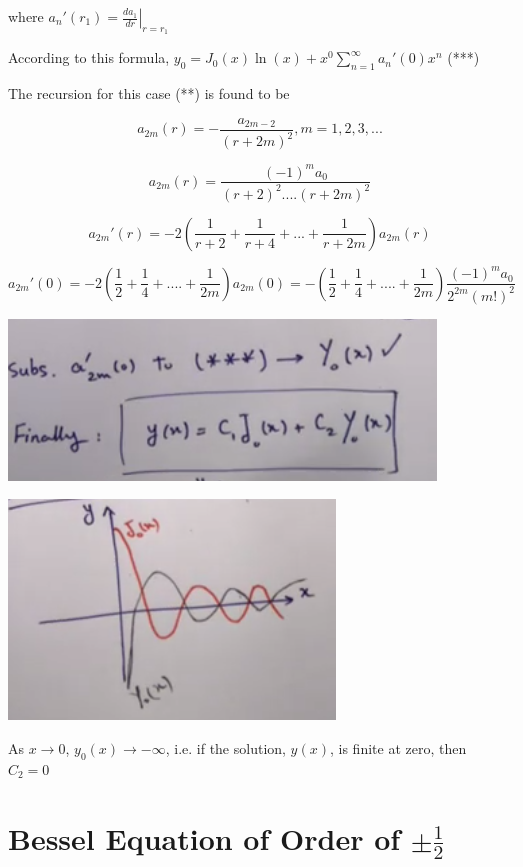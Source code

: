 \documentclass{article}
\begin{document}
where $a_n ' (r_1) = \left. \frac{d a_1}{dr} \right|_{r = r_1}$

According to this formula, $y_0 = J_0 (x) \ln(x) + x^{0} \sum_{n = 1}^\infty a_n' (0) x^n$ (***)

The recursion for this case (**) is found to be 

$$a_{2m} (r) = - \frac{a_{2m-2}}{(r + 2m)^2}, m = 1,2,3,...$$

$$a_{2m}(r) = \frac{(-1)^m a_0}{(r+2)^2 .... (r + 2m)^2}$$

$$a_{2m}' (r) = -2 \left( \frac{1}{r+2} + \frac{1}{r+4} + ... + \frac{1}{r + 2m} \right) a_{2m} (r)$$

$$a_{2m}' (0) = -2 \left( \frac{1}{2} + \frac{1}{4} + .... + \frac{1}{2m} \right) a_{2m}(0) = - \left(\frac{1}{2} + \frac{1}{4} + .... + \frac{1}{2m} \right) \frac{(-1)^m a_0}{2^{2m} (m!)^2} $$

\includegraphics[width = 0.8 \textwidth]{image3.png}

\includegraphics[width = 0.8 \textwidth]{image4.png}

As $x \to 0$, $y_0 (x) \to - \infty$, i.e. if the solution, $y(x)$, is finite at zero, then $C_2 = 0$

\section{Bessel Equation of Order of $\pm \frac{1}{2}$}
\end{document}
